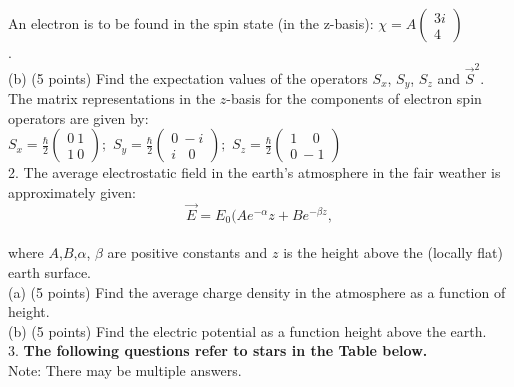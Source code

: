 \documentclass[12pt]{article}
\begin{document}
\begin{center}
\section{}
{An electron is to be found in the spin state (in the z-basis): $\chi = A \begin{pmatrix}3i\\4\end{pmatrix}$}
\\
.
\\
(b) (5 points) Find the expectation values of the operators {\color{red}\textit{$S_x$}}, {\color{purple}\textit{$S_y$}}, {\color{orange}\textit{$S_z$}} and \textit{${\Vec{S}}^2$}.
\\
{The matrix representations in the $z$-basis for the components of electron spin operators are given by:}
\\
{{\color{red}\textbf{$S_x=\frac{\hbar}{2}\begin{pmatrix}0\ 1\\1\ 0\end{pmatrix};$}  \color{purple}\textbf{$S_y=\frac{\hbar}{2}\begin{pmatrix}0\ -i\\i\ \ \ \ 0\end{pmatrix};$} \color{orange}\textbf{$S_z=\frac{\hbar}{2}\begin{pmatrix}1\ \ \ \ \  0\\0\ -1\end{pmatrix}$}}
\\
{2. The average electrostatic field in the earth's atmosphere in the fair weather is approximately given:}
\begin{equation}
    {\Vec{E}} = E_0(Ae^{-\alpha}{z}+Be^{-{\beta}{z}},
\end{equation}
\\
where $A$,$B$,{$\alpha$}, {$\beta$} are positive constants and $z$ is the height above the (locally flat) earth surface.
\\
{(a) (5 points) Find the average charge density in the atmosphere as a function of height}.
\\
{(b) (5 points) Find the electric potential as a function height above the earth}.
\\
{3. \textbf{The following questions refer to stars in the Table below.}}
\\
{Note: There may be multiple answers}.
\\
}
\end{center}
\end{document}
